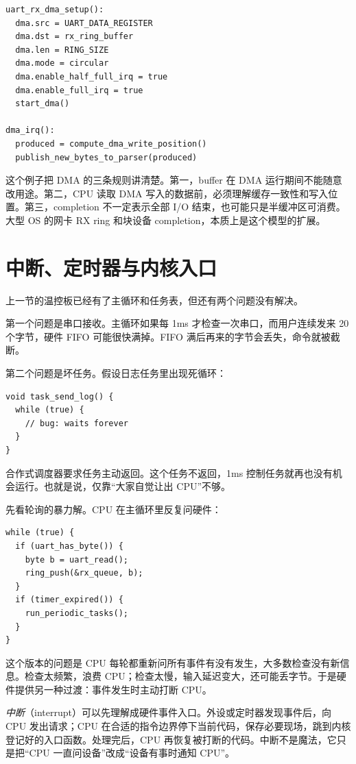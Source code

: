 \begin{lstlisting}
uart_rx_dma_setup():
  dma.src = UART_DATA_REGISTER
  dma.dst = rx_ring_buffer
  dma.len = RING_SIZE
  dma.mode = circular
  dma.enable_half_full_irq = true
  dma.enable_full_irq = true
  start_dma()

dma_irq():
  produced = compute_dma_write_position()
  publish_new_bytes_to_parser(produced)
\end{lstlisting}

这个例子把 DMA 的三条规则讲清楚。第一，buffer 在 DMA 运行期间不能随意改用途。第二，CPU 读取 DMA 写入的数据前，必须理解缓存一致性和写入位置。第三，completion 不一定表示全部 I/O 结束，也可能只是半缓冲区可消费。大型 OS 的网卡 RX ring 和块设备 completion，本质上是这个模型的扩展。

\section{中断、定时器与内核入口}

上一节的温控板已经有了主循环和任务表，但还有两个问题没有解决。

第一个问题是串口接收。主循环如果每 1ms 才检查一次串口，而用户连续发来 20 个字节，硬件 FIFO 可能很快满掉。FIFO 满后再来的字节会丢失，命令就被截断。

第二个问题是坏任务。假设日志任务里出现死循环：

\begin{lstlisting}
void task_send_log() {
  while (true) {
    // bug: waits forever
  }
}
\end{lstlisting}

合作式调度器要求任务主动返回。这个任务不返回，1ms 控制任务就再也没有机会运行。也就是说，仅靠“大家自觉让出 CPU”不够。

先看轮询的暴力解。CPU 在主循环里反复问硬件：

\begin{lstlisting}
while (true) {
  if (uart_has_byte()) {
    byte b = uart_read();
    ring_push(&rx_queue, b);
  }
  if (timer_expired()) {
    run_periodic_tasks();
  }
}
\end{lstlisting}

这个版本的问题是 CPU 每轮都重新问所有事件有没有发生，大多数检查没有新信息。检查太频繁，浪费 CPU；检查太慢，输入延迟变大，还可能丢字节。于是硬件提供另一种过渡：事件发生时主动打断 CPU。

\emph{中断}（interrupt）可以先理解成硬件事件入口。外设或定时器发现事件后，向 CPU 发出请求；CPU 在合适的指令边界停下当前代码，保存必要现场，跳到内核登记好的入口函数。处理完后，CPU 再恢复被打断的代码。中断不是魔法，它只是把“CPU 一直问设备”改成“设备有事时通知 CPU”。

